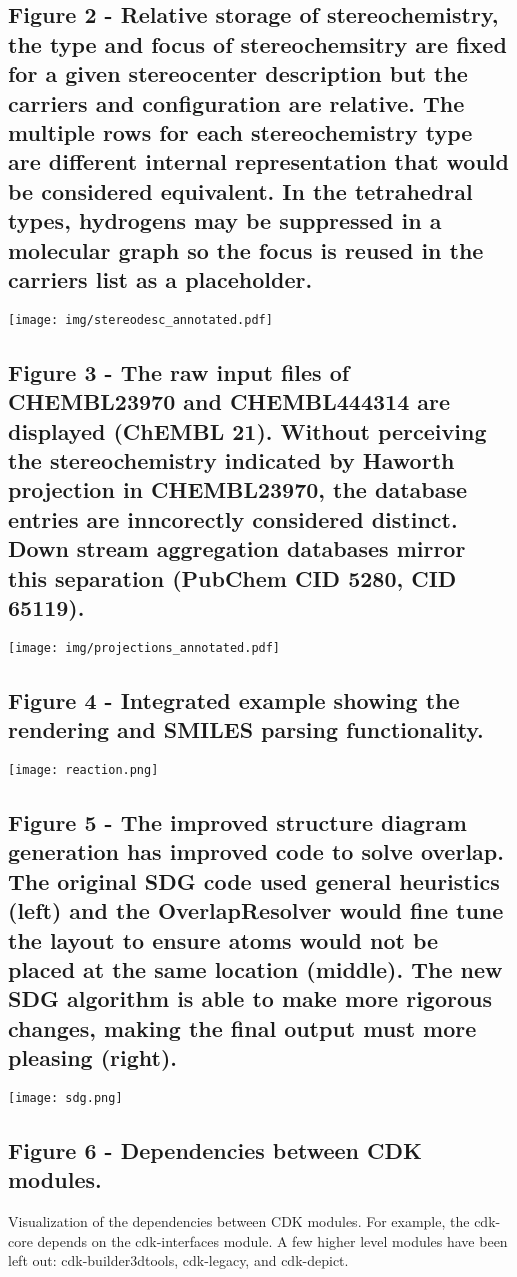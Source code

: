 \documentclass[10pt]{bmcart}
\begin{document}
\begin{backmatter}
\subsection*{Figure 2 - Relative storage of stereochemistry, the \textbf{type} and \textbf{focus} of stereochemsitry are fixed for a given stereocenter description but the \textbf{carriers} and \textbf{configuration} are relative. The multiple rows for each stereochemistry type are different internal representation that would be considered equivalent. In the tetrahedral types, hydrogens may be suppressed in a molecular graph so the \textbf{focus} is reused in the \textbf{carriers} list as a placeholder.}\label{fig:stereodatastructure}

\texttt{[image: img/stereodesc\_annotated.pdf]}

\subsection*{Figure 3 - The raw input files of CHEMBL23970 and CHEMBL444314 are displayed (ChEMBL 21). Without perceiving the stereochemistry indicated by Haworth projection in CHEMBL23970, the database entries are inncorectly considered distinct. Down stream aggregation databases mirror this separation (PubChem CID 5280, CID 65119).}\label{fig:stereoprojections}

\texttt{[image: img/projections\_annotated.pdf]}

\subsection*{Figure 4 - Integrated example showing the rendering and SMILES
parsing functionality.}\label{fig:depiction}

\texttt{[image: reaction.png]}

\subsection*{Figure 5 - The improved structure diagram generation has improved
code to solve overlap. The original SDG code used general heuristics (left) and the
OverlapResolver would fine tune the layout to ensure atoms would not be placed
at the same location (middle). The new SDG algorithm is able to
make more rigorous changes, making the final output must more pleasing
(right).}\label{fig:sdg}

\texttt{[image: sdg.png]}

  \subsection*{Figure 6 - Dependencies between CDK modules.}\label{fig:deps}
      Visualization of the dependencies between CDK modules. For example,
      the cdk-core depends on the cdk-interfaces module. A few higher level
      modules have been left out: cdk-builder3dtools, cdk-legacy, and
      cdk-depict.


\end{backmatter}
\end{document}
